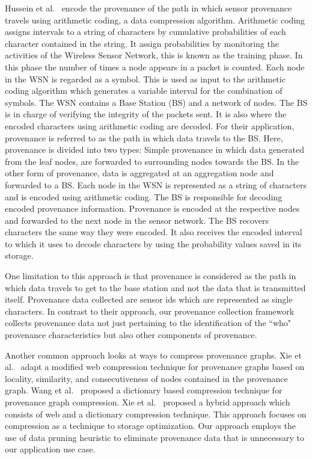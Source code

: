 Hussein et al.~\cite{hussain_secure_2014} encode the provenance of the path in which  sensor provenance travels using arithmetic coding, a data compression algorithm. Arithmetic coding assigns intervals to a string of characters by  cumulative probabilities of each character contained in the string. It assign probabilities by monitoring the activities of the Wireless Sensor Network, this is known as the training phase. In this phase the number of times a node appears in a packet is counted. Each node in the WSN is regarded as a symbol. This is used as input to the arithmetic coding algorithm which generates a variable interval for the combination of symbols. The WSN contains a Base Station (BS) and a network of nodes. The BS is in charge of verifying the integrity of the packets sent. It is also where the encoded characters using arithmetic coding are decoded. For their application, provenance is referred to as the path in which data travels to the BS. Here, provenance is divided into two types: Simple provenance in which data generated from the leaf nodes, are forwarded to surrounding nodes towards the BS. In the other form of provenance, data is aggregated at an aggregation node and forwarded to a BS. Each node in the WSN is represented as a string of characters and is encoded using arithmetic coding. The BS is responsible for decoding encoded provenance information. Provenance is encoded at the respective nodes and forwarded to the next node in the sensor network. The BS recovers characters the same way they were encoded. It also receives the encoded interval to which it uses to decode characters by using the probability values saved in its storage.

 One limitation to this approach is that provenance is considered as the path in which data travels to get to the base station and not the data that is transmitted itself. Provenance data collected are sensor ids which are represented as single characters. In contrast to their approach, our provenance collection framework collects provenance data not just pertaining to the identification of the ``who" provenance characteristics but also other components of provenance. 
 
 Another common approach looks at ways to compress provenance graphs. Xie et al.~\cite{xie11-tapp}  adapt a modified web compression technique for provenance graphs based on locality, similarity, and consecutiveness of nodes contained in the provenance graph.  Wang et al.~\cite{7038199} proposed a dictionary based compression technique for provenance graph compression.  Xie et al.~\cite{Xie:2012:HAE:2396761.2398511} proposed a hybrid approach which consists of web and a dictionary compression technique. This approach focuses on compression as a technique to storage optimization. Our approach employs the use of data pruning heuristic  to eliminate provenance data that is unnecessary to our application use case. 
 
